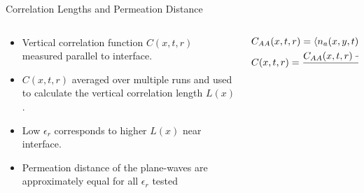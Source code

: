 \documentclass{beamer}
\begin{document}
    \begin{frame}[t]{Correlation Lengths and Permeation Distance}
        \begin{columns}
            \begin{column}{0.3\textwidth}
                \vspace{-30pt}

                \begin{itemize}[leftmargin=1pt]
                \footnotesize
                    \item Vertical correlation function $ C(x,t, r) $ measured parallel
                        to interface.
                    \item $ C(x,t,r) $ averaged over multiple runs and used to calculate the vertical correlation length $ L(x) $.
                    \item Low $ \epsilon_r $ corresponds to higher $ L(x) $ near
                        interface.
                    \item Permeation distance of the plane-waves are approximately 
                        equal for all $ \epsilon_r $ tested
                \end{itemize}
            \end{column}
            \begin{column}{0.7\textwidth}
                
                \hfuzz=15pt
                \vspace{-15pt}

                \small{
                \begin{align*}
                    \hfill
                    &C_{AA}(x,t,r) = \braket{n_a(x, y, t)n_a(x, y+r, t)} - (a(x, t))^2
                    \hspace{-20pt} \\
                    \hfill
                    &C(x,t,r) =  \frac{C_{AA}(x,t,r) + C_{BB}(x,t,r) + C_{CC}(x,t,r)}{3}  
                    \hspace{-20pt}
                \end{align*}
                }

                \vspace{-35pt}


\end{column}
\end{columns}
\end{frame}
\end{document}
